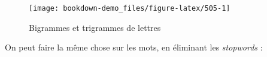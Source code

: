 \documentclass[
]{book}
\newenvironment{Shaded}{\begin{snugshade}}{\end{snugshade}}
\newcommand{\DataTypeTok}[1]{\textcolor[rgb]{0.13,0.29,0.53}{#1}}
\newcommand{\DecValTok}[1]{\textcolor[rgb]{0.00,0.00,0.81}{#1}}
\newcommand{\KeywordTok}[1]{\textcolor[rgb]{0.13,0.29,0.53}{\textbf{#1}}}
\newcommand{\NormalTok}[1]{#1}
\newcommand{\OperatorTok}[1]{\textcolor[rgb]{0.81,0.36,0.00}{\textbf{#1}}}
\newcommand{\StringTok}[1]{\textcolor[rgb]{0.31,0.60,0.02}{#1}}
\begin{document}
\begin{figure}

{\centering \texttt{[image: bookdown-demo\_files/figure-latex/505-1]} 

}

\caption{Bigrammes et trigrammes de lettres}\label{fig:505}
\end{figure}

On peut faire la même chose sur les mots, en éliminant les \emph{stopwords} :

\begin{Shaded}
\end{Shaded}

\providecommand{\docline}[3]{\noalign{\global\setlength{\arrayrulewidth}{#1}}\arrayrulecolor[HTML]{#2}\cline{#3}}

\setlength{\tabcolsep}{2pt}

\renewcommand*{\arraystretch}{1.5}
\end{document}
